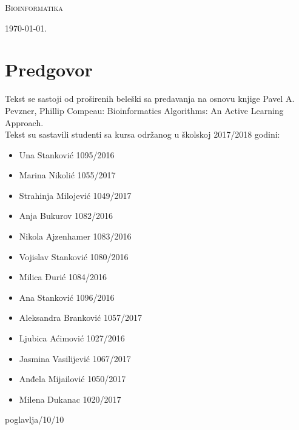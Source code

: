 \documentclass[a4paper]{book}
\begin{document}
\begin{titlepage}
	\vspace*{0.4\textheight}
	
	\begin{center}
		{\Huge \textsc{Bioinformatika}}
	\end{center}
	
	\vfill
	
	\begin{center}
		{\Large \today.}
	\end{center}
\end{titlepage}

\blankpage

\frontmatter
\tableofcontents
\blankpage

\chapter*{Predgovor}
Tekst se sastoji od proširenih beleški sa predavanja na osnovu knjige Pavel A. Pevzner, Phillip Compeau: Bioinformatics Algorithms: An Active Learning Approach. \\Tekst su sastavili studenti sa kursa održanog u školskoj 2017/2018 godini: 
\begin{itemize}
	\item Una Stanković 1095/2016
	\item Marina Nikolić 1055/2017
	\item Strahinja Milojević 1049/2017
	\item Anja Bukurov 1082/2016
	\item Nikola Ajzenhamer 1083/2016
	\item Vojislav Stanković 1080/2016
	\item Milica Đurić 1084/2016
	\item Ana Stanković 1096/2016
	\item Aleksandra Branković 1057/2017
	\item Ljubica Aćimović 1027/2016
	\item Jasmina Vasilijević 1067/2017
	\item Anđela Mijailović 1050/2017
	\item Milena Dukanac 1020/2017
\end{itemize}


\blankpage

\mainmatter






 {poglavlja/10/10}


\backmatter
\renewcommand{\bibname}{Literatura}

\begingroup
\raggedright

\endgroup


\end{document}
